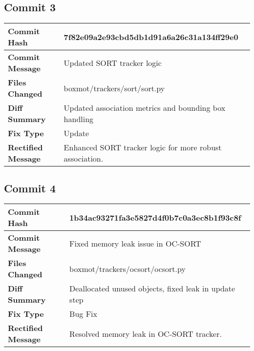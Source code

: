 \documentclass[12pt,a4paper]{article}
\begin{document}
\vspace{1cm}

\subsection*{Commit 3}
\begin{tabular}{|p{3cm}|p{10cm}|}
\hline
\textbf{Commit Hash} & 7f82e09a2e93cbd5db1d91a6a26c31a134ff29e0 \\
\hline
\textbf{Commit Message} & Updated SORT tracker logic \\
\hline
\textbf{Files Changed} & 
boxmot/trackers/sort/sort.py \\
\hline
\textbf{Diff Summary} & Updated association metrics and bounding box handling \\
\hline
\textbf{Fix Type} & Update \\
\hline
\textbf{Rectified Message} & Enhanced SORT tracker logic for more robust association. \\
\hline
\end{tabular}

\vspace{1cm}

\subsection*{Commit 4}
\begin{tabular}{|p{3cm}|p{10cm}|}
\hline
\textbf{Commit Hash} & 1b34ac93271fa3e5827d4f0b7c0a3ec8b1f93c8f \\
\hline
\textbf{Commit Message} & Fixed memory leak issue in OC-SORT \\
\hline
\textbf{Files Changed} & 
boxmot/trackers/ocsort/ocsort.py \\
\hline
\textbf{Diff Summary} & Deallocated unused objects, fixed leak in update step \\
\hline
\textbf{Fix Type} & Bug Fix \\
\hline
\textbf{Rectified Message} & Resolved memory leak in OC-SORT tracker. \\
\hline
\end{tabular}

\vspace{1cm}

\end{document}
